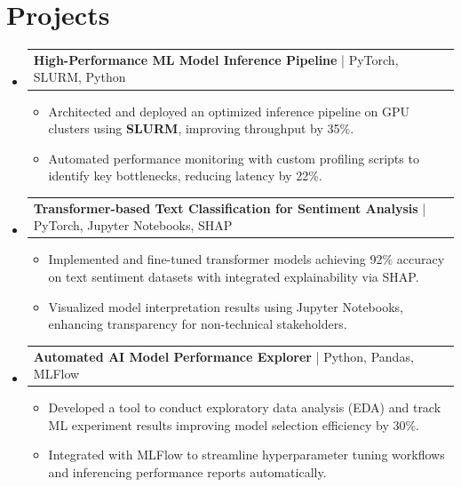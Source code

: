 \documentclass[letterpaper,11pt]{article}
\makeatletter
\newcommand{\resumeItem}[1]{
  \item\footnotesize{
    {#1 \vspace{-2pt}}
  }
}
\newcommand{\resumeProjectHeading}[2]{
    \item
    \begin{tabular*}{1.001\textwidth}{l@{\extracolsep{\fill}}r}
      \small#1 & \textbf{\small #2}\\
    \end{tabular*}\vspace{-7pt}
}
\newcommand{\resumeSubHeadingListStart}{\begin{itemize}[leftmargin=0pt, label={}]}
\newcommand{\resumeSubHeadingListEnd}{\end{itemize}}
\newcommand{\resumeItemListStart}{\begin{itemize}[leftmargin=*]}
\newcommand{\resumeItemListEnd}{\end{itemize}\vspace{-5pt}}
\makeatother
\begin{document}
\section{Projects}
    \vspace{-5pt}
    \resumeSubHeadingListStart
          \resumeProjectHeading
              {\textbf{High-Performance ML Model Inference Pipeline} | PyTorch, SLURM, Python}{}
        \resumeItemListStart
            \resumeItem{Architected and deployed an optimized inference pipeline on GPU clusters using \textbf{SLURM}, improving throughput by 35\%.}
            \resumeItem{Automated performance monitoring with custom profiling scripts to identify key bottlenecks, reducing latency by 22\%.}
        \resumeItemListEnd
        \vspace{-12pt}
    
    \resumeProjectHeading
        {\textbf{Transformer-based Text Classification for Sentiment Analysis} | PyTorch, Jupyter Notebooks, SHAP}{}
        \resumeItemListStart
            \resumeItem{Implemented and fine-tuned transformer models achieving 92\% accuracy on text sentiment datasets with integrated explainability via SHAP.}
            \resumeItem{Visualized model interpretation results using Jupyter Notebooks, enhancing transparency for non-technical stakeholders.}
        \resumeItemListEnd
          \vspace{-12pt}
      \resumeProjectHeading
          {\textbf{Automated AI Model Performance Explorer} | Python, Pandas, MLFlow}{}
          \resumeItemListStart
              \resumeItem{Developed a tool to conduct exploratory data analysis (EDA) and track ML experiment results improving model selection efficiency by 30\%.}
              \resumeItem{Integrated with MLFlow to streamline hyperparameter tuning workflows and inferencing performance reports automatically.}
          \resumeItemListEnd 
    \resumeSubHeadingListEnd
\end{document}
